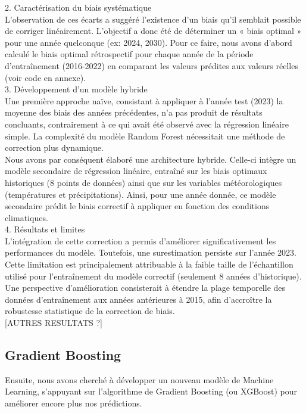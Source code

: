 \documentclass{article}
\theoremstyle{nopointbreak}
\theoremstyle{nobrkbold}
\begin{document}
2. Caractérisation du biais systématique \\
L'observation de ces écarts a suggéré l'existence d'un biais qu'il semblait possible de corriger linéairement. L'objectif a donc été de déterminer un « biais optimal » pour une année quelconque (ex: 2024, 2030). Pour ce faire, nous avons d'abord calculé le biais optimal rétrospectif pour chaque année de la période d'entraînement (2016-2022) en comparant les valeurs prédites aux valeurs réelles (voir code en annexe).\\

3. Développement d'un modèle hybride \\
Une première approche naïve, consistant à appliquer à l'année test (2023) la moyenne des biais des années précédentes, n'a pas produit de résultats concluants, contrairement à ce qui avait été observé avec la régression linéaire simple. La complexité du modèle Random Forest nécessitait une méthode de correction plus dynamique. \\
Nous avons par conséquent élaboré une architecture hybride. Celle-ci intègre un modèle secondaire de régression linéaire, entraîné sur les biais optimaux historiques (8 points de données) ainsi que sur les variables météorologiques (températures et précipitations). Ainsi, pour une année donnée, ce modèle secondaire prédit le biais correctif à appliquer en fonction des conditions climatiques. \\

4. Résultats et limites \\
L'intégration de cette correction a permis d'améliorer significativement les performances du modèle. Toutefois, une surestimation persiste sur l'année 2023. Cette limitation est principalement attribuable à la faible taille de l'échantillon utilisé pour l'entraînement du modèle correctif (seulement 8 années d'historique). Une perspective d'amélioration consisterait à étendre la plage temporelle des données d'entraînement aux années antérieures à 2015, afin d'accroître la robustesse statistique de la correction de biais. \\

[AUTRES RESULTATS ?]

\subsection{Gradient Boosting}

Ensuite, nous avons cherché à développer un nouveau modèle de Machine Learning, s'appuyant sur l'algorithme de Gradient Boosting (ou XGBoost) pour améliorer encore plus nos prédictions. \\
\end{document}
